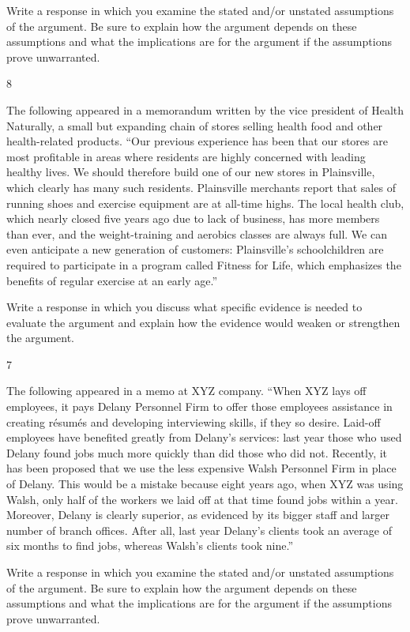 \documentclass[]{article}
\begin{document}
Write a response in which you examine the stated and/or unstated
assumptions of the argument. Be sure to explain how the argument depends
on these assumptions and what the implications are for the argument if
the assumptions prove unwarranted.

8

The following appeared in a memorandum written by the vice president of
Health Naturally, a small but expanding chain of stores selling health
food and other health-related products. ``Our previous experience has
been that our stores are most profitable in areas where residents are
highly concerned with leading healthy lives. We should therefore build
one of our new stores in Plainsville, which clearly has many such
residents. Plainsville merchants report that sales of running shoes and
exercise equipment are at all-time highs. The local health club, which
nearly closed five years ago due to lack of business, has more members
than ever, and the weight-training and aerobics classes are always full.
We can even anticipate a new generation of customers: Plainsville's
schoolchildren are required to participate in a program called Fitness
for Life, which emphasizes the benefits of regular exercise at an early
age.''

Write a response in which you discuss what specific evidence is needed
to evaluate the argument and explain how the evidence would weaken or
strengthen the argument.

7

The following appeared in a memo at XYZ company. ``When XYZ lays off
employees, it pays Delany Personnel Firm to offer those employees
assistance in creating résumés and developing interviewing skills, if
they so desire. Laid-off employees have benefited greatly from Delany's
services: last year those who used Delany found jobs much more quickly
than did those who did not. Recently, it has been proposed that we use
the less expensive Walsh Personnel Firm in place of Delany. This would
be a mistake because eight years ago, when XYZ was using Walsh, only
half of the workers we laid off at that time found jobs within a year.
Moreover, Delany is clearly superior, as evidenced by its bigger staff
and larger number of branch offices. After all, last year Delany's
clients took an average of six months to find jobs, whereas Walsh's
clients took nine.''

Write a response in which you examine the stated and/or unstated
assumptions of the argument. Be sure to explain how the argument depends
on these assumptions and what the implications are for the argument if
the assumptions prove unwarranted.
\end{document}
